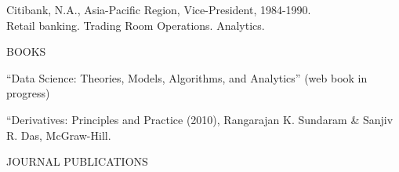 \documentclass{article}
\begin{document}
\begin{description} 
\item[NON-ACADEMIC EXPERIENCE] \mbox{}

\item Citibank, N.A., Asia-Pacific Region, Vice-President, 1984-1990.\\
Retail banking. Trading Room Operations. Analytics.

\end{description}


\begin{description}
\item[BOOKS] \mbox{}
\end{description}

\begin{etaremune}
\setlength\itemsep{-0.1em}

\item ``Data Science: Theories, Models, Algorithms, and Analytics'' (web book in progress)

\item ``Derivatives: Principles and Practice (2010), Rangarajan K. Sundaram \& Sanjiv R. Das, McGraw-Hill. 

\end{etaremune}


\begin{description}
\item[JOURNAL PUBLICATIONS] \mbox{}
\end{description}
\end{document}

